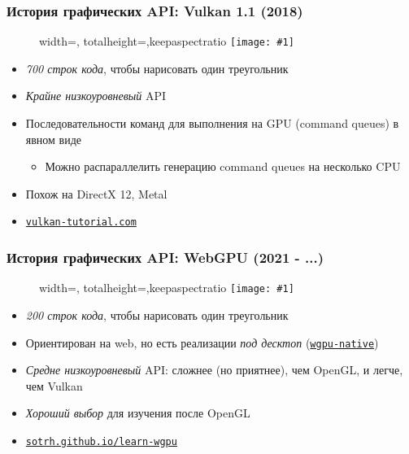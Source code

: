 \documentclass[10pt]{beamer}
\newcommand{\slideimage}[1]{
  \begin{figure}
    \begin{adjustbox}{width=\textwidth, totalheight=\textheight-2\baselineskip-2\baselineskip,keepaspectratio}
      \texttt{[image: \#1]}
    \end{adjustbox}
  \end{figure}
}
\begin{document}
\begin{frame}
\frametitle{История графических API: Vulkan 1.1 (2018)}
\slideimage{vulkan.png}
\begin{itemize}
\item \textit{700 строк кода}, чтобы нарисовать один треугольник
\pause
\item \textit{Крайне низкоуровневый} API
\item Последовательности команд для выполнения на GPU (command queues) в явном виде
\begin{itemize}
\item Можно распараллелить генерацию command queues на несколько CPU
\end{itemize}
\pause
\item Похож на DirectX 12, Metal
\item \href{https://vulkan-tutorial.com}{\nolinkurl{vulkan-tutorial.com}}
\end{itemize}
\end{frame}

\begin{frame}
\frametitle{История графических API: WebGPU (2021 - ...)}
\slideimage{webgpu.png}
\begin{itemize}
\item \textit{200 строк кода}, чтобы нарисовать один треугольник
\pause
\item Ориентирован на web, но есть реализации \textit{под десктоп} (\href{https://github.com/gfx-rs/wgpu-native}{\nolinkurl{wgpu-native}})
\pause
\item \textit{Средне низкоуровневый} API: сложнее (но приятнее), чем OpenGL, и легче, чем Vulkan
\item \textit{Хороший выбор} для изучения после OpenGL
\item \href{https://sotrh.github.io/learn-wgpu/}{\nolinkurl{sotrh.github.io/learn-wgpu}}
\end{itemize}
\end{frame}
\end{document}
